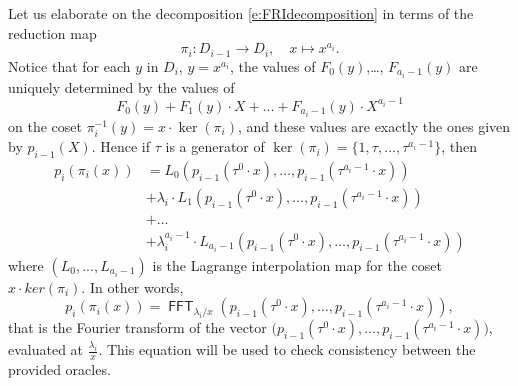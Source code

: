 \documentclass[11pt]{article}
\theoremstyle{definition}
\theoremstyle{remark}
\DeclareMathOperator{\FFT}{\mathsf{FFT}}
\begin{document}
Let us elaborate on the decomposition \eqref{e:FRIdecomposition} in terms of the reduction map
\[
\pi_i: D_{i-1}\longrightarrow D_i, \quad x\mapsto x^{a_i}.
\] 
Notice that for each $y$ in $D_i$, $y= x^{a_i}$, the values of $F_0(y)$,\ldots, $F_{a_i-1}(y)$ are uniquely determined by the values of 
\[
F_0(y)+ F_1(y)\cdot X+...+F_{a_i-1}(y)\cdot X^{a_i-1} 
\] 
on the coset $\pi_i^{-1}(y)=x\cdot\ker(\pi_i)$, and these values are exactly the ones given by $p_{i-1}(X)$.
Hence if $\tau$ is a generator of $\ker(\pi_i)=\{1,\tau,\ldots, \tau^{a_i-1}\}$, then
\begin{equation*}
\begin{aligned}
p_i(\pi_i(x)) &= L_0\left(p_{i-1}\left(\tau^0\cdot x\right),\ldots, p_{i-1}\left(\tau^{a_i-1}\cdot x\right)\right) 
\\
&+ 
\lambda_i\cdot L_1\left(p_{i-1}\left(\tau^0\cdot x\right),\ldots, p_{i-1}\left(\tau^{a_i-1}\cdot x\right)\right) 
\\
&+ \ldots
\\
& + \lambda_i^{a_i-1}\cdot L_{a_i-1}\left(p_{i-1}\left(\tau^0\cdot x\right),\ldots, p_{i-1}\left(\tau^{a_i-1}\cdot x\right)\right) 
\end{aligned}
\end{equation*}
where $(L_0,...,L_{a_i-1})$ is the Lagrange interpolation map for the coset $x\cdot ker(\pi_i)$. 
In other words, 
\begin{equation}
\label{e:FRIconsistency}
p_i(\pi_i(x)) = \FFT_{\lambda_i / x}\left(p_{i-1}\left(\tau^0\cdot x\right),\ldots, p_{i-1}\left(\tau^{a_i-1}\cdot x\right)\right),
\end{equation}
that is the Fourier transform of the vector $\big(p_{i-1}\left(\tau^0\cdot x\right),\ldots, p_{i-1}\left(\tau^{a_i-1}\cdot x\right)\big)$, evaluated at $\frac{\lambda_i}{x}$.
This equation will be used to check consistency between the provided oracles. 
%
\end{document}
